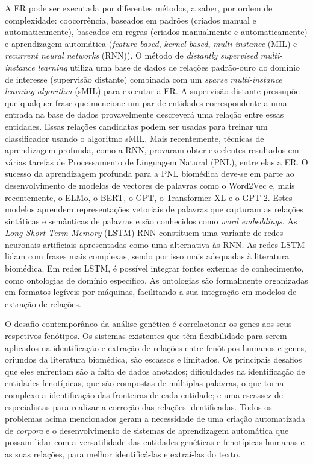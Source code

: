 A ER pode ser executada por diferentes métodos, a saber, por ordem de complexidade: coocorrência, baseados em padrões (criados manual e automaticamente), baseados em regras (criados manualmente e automaticamente) e aprendizagem automática (\textit{feature-based}, \textit{kernel-based}, \textit{multi-instance} (MIL) e \textit{recurrent neural networks} (RNN)). O método de \textit{distantly supervised multi-instance learning} utiliza uma base de dados de relações padrão-ouro do domínio de interesse (supervisão distante) combinada com um \textit{sparse multi-instance learning algorithm} (sMIL) para executar a ER. A supervisão distante pressupõe que qualquer frase que mencione um par de entidades correspondente a uma entrada na base de dados provavelmente descreverá uma relação entre essas entidades. Essas relações candidatas podem ser usadas para treinar um classificador usando o algoritmo sMIL. Mais recentemente, técnicas de aprendizagem profunda, como a RNN, provaram obter excelentes resultados em várias tarefas de Processamento de Linguagem Natural (PNL), entre elas a ER. O sucesso da aprendizagem profunda para a PNL biomédica deve-se em parte ao desenvolvimento de modelos de vectores de palavras como o Word2Vec e, mais recentemente, o ELMo, o BERT, o GPT, o Transformer-XL e o GPT-2. Estes modelos aprendem representações vetoriais de palavras que capturam as relações sintáticas e semânticas de palavras e são conhecidos como \textit{word embeddings}. As \textit{Long Short-Term Memory} (LSTM) RNN constituem uma variante de redes neuronais artificiais apresentadas como uma alternativa às RNN. As redes LSTM lidam com frases mais complexas, sendo por isso mais adequadas à literatura biomédica. Em redes LSTM, é possível integrar fontes externas de conhecimento, como ontologias de domínio específico. As ontologias são formalmente organizadas em formatos legíveis por máquinas, facilitando a sua integração em modelos de extração de relações.

O desafio contemporâneo da análise genética é correlacionar os genes aos seus respetivos fenótipos. Os sistemas existentes que têm flexibilidade para serem aplicados na identificação e extração de relações entre fenótipos humanos e genes, oriundos da literatura biomédica, são escassos e limitados. Os principais desafios que eles enfrentam são a falta de dados anotados; dificuldades na identificação de entidades fenotípicas, que são compostas de múltiplas palavras, o que torna complexo a identificação das fronteiras de cada entidade; e uma escassez de especialistas para realizar a correção das relações identificadas. Todos os problemas acima mencionados geram a necessidade de uma criação automatizada de \textit{corpora} e o desenvolvimento de sistemas de aprendizagem automática que possam lidar com a versatilidade das entidades genéticas e fenotípicas humanas e as suas relações, para melhor identificá-las e extraí-las do texto.


